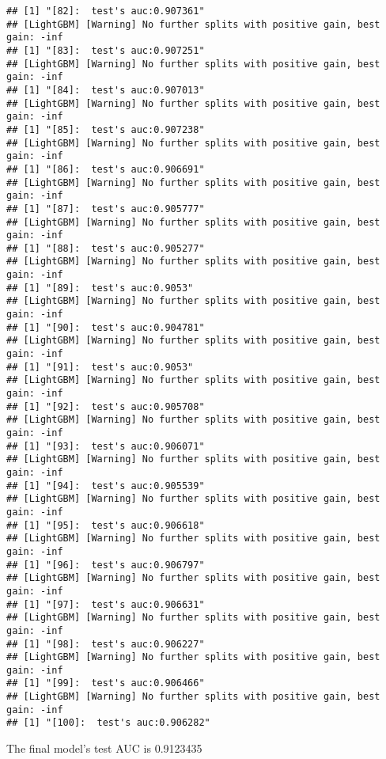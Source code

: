 \documentclass[
]{article}
\newenvironment{Shaded}{\begin{snugshade}}{\end{snugshade}}
\newcommand{\NormalTok}[1]{#1}
\newcommand{\OtherTok}[1]{\textcolor[rgb]{0.56,0.35,0.01}{#1}}
\newcommand{\SpecialCharTok}[1]{\textcolor[rgb]{0.00,0.00,0.00}{#1}}
\begin{document}
\begin{verbatim}
## [1] "[82]:  test's auc:0.907361"
## [LightGBM] [Warning] No further splits with positive gain, best gain: -inf
## [1] "[83]:  test's auc:0.907251"
## [LightGBM] [Warning] No further splits with positive gain, best gain: -inf
## [1] "[84]:  test's auc:0.907013"
## [LightGBM] [Warning] No further splits with positive gain, best gain: -inf
## [1] "[85]:  test's auc:0.907238"
## [LightGBM] [Warning] No further splits with positive gain, best gain: -inf
## [1] "[86]:  test's auc:0.906691"
## [LightGBM] [Warning] No further splits with positive gain, best gain: -inf
## [1] "[87]:  test's auc:0.905777"
## [LightGBM] [Warning] No further splits with positive gain, best gain: -inf
## [1] "[88]:  test's auc:0.905277"
## [LightGBM] [Warning] No further splits with positive gain, best gain: -inf
## [1] "[89]:  test's auc:0.9053"
## [LightGBM] [Warning] No further splits with positive gain, best gain: -inf
## [1] "[90]:  test's auc:0.904781"
## [LightGBM] [Warning] No further splits with positive gain, best gain: -inf
## [1] "[91]:  test's auc:0.9053"
## [LightGBM] [Warning] No further splits with positive gain, best gain: -inf
## [1] "[92]:  test's auc:0.905708"
## [LightGBM] [Warning] No further splits with positive gain, best gain: -inf
## [1] "[93]:  test's auc:0.906071"
## [LightGBM] [Warning] No further splits with positive gain, best gain: -inf
## [1] "[94]:  test's auc:0.905539"
## [LightGBM] [Warning] No further splits with positive gain, best gain: -inf
## [1] "[95]:  test's auc:0.906618"
## [LightGBM] [Warning] No further splits with positive gain, best gain: -inf
## [1] "[96]:  test's auc:0.906797"
## [LightGBM] [Warning] No further splits with positive gain, best gain: -inf
## [1] "[97]:  test's auc:0.906631"
## [LightGBM] [Warning] No further splits with positive gain, best gain: -inf
## [1] "[98]:  test's auc:0.906227"
## [LightGBM] [Warning] No further splits with positive gain, best gain: -inf
## [1] "[99]:  test's auc:0.906466"
## [LightGBM] [Warning] No further splits with positive gain, best gain: -inf
## [1] "[100]:  test's auc:0.906282"
\end{verbatim}

\begin{Shaded}
\end{Shaded}

The final model's test AUC is 0.9123435
\end{document}
